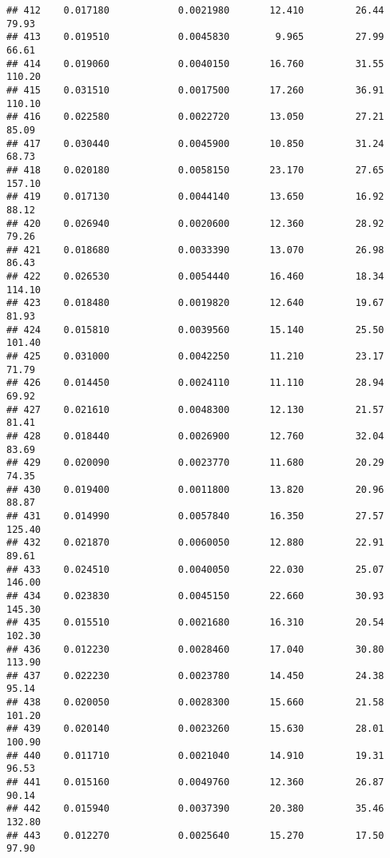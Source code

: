 \documentclass[
]{article}
\begin{document}
\begin{verbatim}
## 412    0.017180            0.0021980       12.410         26.44           79.93
## 413    0.019510            0.0045830        9.965         27.99           66.61
## 414    0.019060            0.0040150       16.760         31.55          110.20
## 415    0.031510            0.0017500       17.260         36.91          110.10
## 416    0.022580            0.0022720       13.050         27.21           85.09
## 417    0.030440            0.0045900       10.850         31.24           68.73
## 418    0.020180            0.0058150       23.170         27.65          157.10
## 419    0.017130            0.0044140       13.650         16.92           88.12
## 420    0.026940            0.0020600       12.360         28.92           79.26
## 421    0.018680            0.0033390       13.070         26.98           86.43
## 422    0.026530            0.0054440       16.460         18.34          114.10
## 423    0.018480            0.0019820       12.640         19.67           81.93
## 424    0.015810            0.0039560       15.140         25.50          101.40
## 425    0.031000            0.0042250       11.210         23.17           71.79
## 426    0.014450            0.0024110       11.110         28.94           69.92
## 427    0.021610            0.0048300       12.130         21.57           81.41
## 428    0.018440            0.0026900       12.760         32.04           83.69
## 429    0.020090            0.0023770       11.680         20.29           74.35
## 430    0.019400            0.0011800       13.820         20.96           88.87
## 431    0.014990            0.0057840       16.350         27.57          125.40
## 432    0.021870            0.0060050       12.880         22.91           89.61
## 433    0.024510            0.0040050       22.030         25.07          146.00
## 434    0.023830            0.0045150       22.660         30.93          145.30
## 435    0.015510            0.0021680       16.310         20.54          102.30
## 436    0.012230            0.0028460       17.040         30.80          113.90
## 437    0.022230            0.0023780       14.450         24.38           95.14
## 438    0.020050            0.0028300       15.660         21.58          101.20
## 439    0.020140            0.0023260       15.630         28.01          100.90
## 440    0.011710            0.0021040       14.910         19.31           96.53
## 441    0.015160            0.0049760       12.360         26.87           90.14
## 442    0.015940            0.0037390       20.380         35.46          132.80
## 443    0.012270            0.0025640       15.270         17.50           97.90

\end{verbatim}
\end{document}
